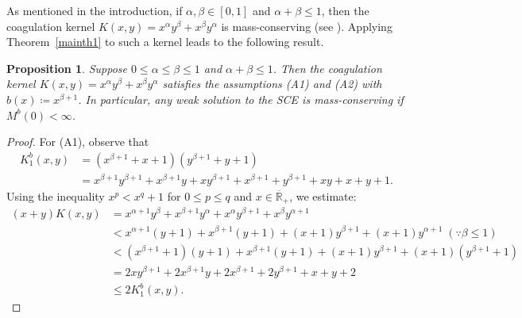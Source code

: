 \documentclass[a4paper,11pt]{article}
\newtheorem{prop}[thm]{Proposition}
\def\Rb{\overline{{\mathbb R}}_+}
\begin{document}
As mentioned in the introduction, if $\alpha,\beta\in[0,1]$ and $\alpha+\beta \le 1$, then the coagulation kernel $K(x, y) = x^\alpha y^\beta+x^\beta y^\alpha$ is mass-conserving (see \cite{E-L-M-P2003}). Applying Theorem~\ref{mainth1} to such a kernel leads to the following result.
\begin{prop}\label{hk-prop}
Suppose $0\leq\alpha\leq\beta\leq1$ and $\alpha+\beta\leq1$. Then the coagulation kernel $K(x,y)=x^\alpha y^\beta +x^\beta y^\alpha$ satisfies the assumptions (A1) and (A2) with  $b(x)\coloneqq x^{\beta+1}$. In particular, any weak solution to the SCE is mass-conserving if $M^b(0)<\infty$.
\end{prop}
\begin{proof}
For (A1), observe that
\begin{align*}
K_1^b(x,y) 
    &= (x^{\beta+1}+x+1)(y^{\beta+1}+y+1)\\
    &=x^{\beta+1}y^{\beta+1} + x^{\beta+1}y + xy^{\beta+1}  + x^{\beta+1}  + y^{\beta+1} + xy + x  + y + 1.
  \end{align*}
Using the inequality $x^p<x^q +1$ for $0\leq p\leq q$ and $x\in\Rb$, we estimate:
\begin{align*}
(x+y)K(x,y)&=x^{\alpha+1}y^\beta+x^{\beta+1}y^\alpha+x^\alpha y^{\beta+1}+x^\beta y^{\alpha+1}\\
    &< x^{\alpha+1}(y+1)+x^{\beta+1}(y+1)+(x+1)y^{\beta+1}+(x+1)y^{\alpha+1} \;(\because\beta\leq 1) \\
    &< (x^{\beta+1}+1)(y+1)+x^{\beta+1}(y+1)+(x+1)y^{\beta+1}+(x+1)(y^{\beta+1}+1) \\
    &=  2 x y^{\beta + 1}+ 2 x^{\beta + 1}y+2 x^{\beta + 1} + 2 y^{\beta + 1} + x + y + 2 \\
    &\leq 2 K_1^b(x,y).
  \end{align*}


\end{proof}
\end{document}
